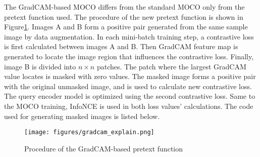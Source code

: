 \documentclass[12pt,twoside]{report}
\begin{document}




The GradCAM-based MOCO differs from the standard MOCO only from the pretext function used. The procedure of the new pretext function is shown in Figure\ref{fig:grad_perturb_explain}. Images A and B form a positive pair generated from the same sample image by data augmentation. In each mini-batch training step, a contrastive loss is first calculated between images A and B. Then GradCAM feature map is generated to locate the image region that influences the contrastive loss. Finally, image B is divided into $n \times n$ patches. The patch where the largest GradCAM value locates is masked with zero values. The masked image forms a positive pair with the original unmasked image, and is used to calculate new contrastive loss. The query encoder model is optimized using the second contrastive loss. Same to the MOCO training, InfoNCE is used in both loss values' calculations. The code used for generating masked images is listed below. 

\begin{figure}
  \centering
  \texttt{[image: figures/gradcam\_explain.png]}
  \caption{Procedure of the GradCAM-based pretext function}
  \label{fig:grad_perturb_explain}
\end{figure}
\end{document}

